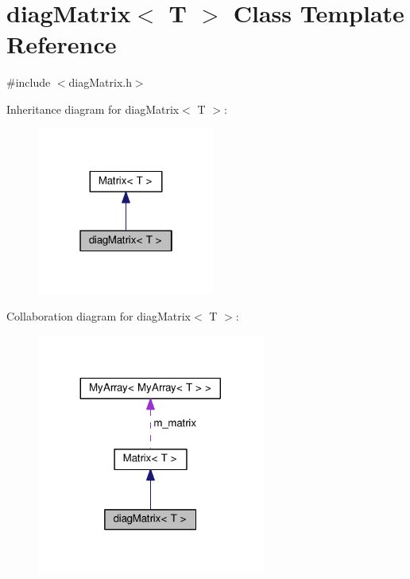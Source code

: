 \hypertarget{classdiagMatrix}{}\section{diag\+Matrix$<$ T $>$ Class Template Reference}
\label{classdiagMatrix}


{\ttfamily \#include $<$diag\+Matrix.\+h$>$}



Inheritance diagram for diag\+Matrix$<$ T $>$\+:\nopagebreak
\begin{figure}[H]
\begin{center}
\leavevmode
\includegraphics[width=166pt]{classdiagMatrix__inherit__graph}
\end{center}
\end{figure}


Collaboration diagram for diag\+Matrix$<$ T $>$\+:\nopagebreak
\begin{figure}[H]
\begin{center}
\leavevmode
\includegraphics[width=212pt]{classdiagMatrix__coll__graph}
\end{center}
\end{figure}
